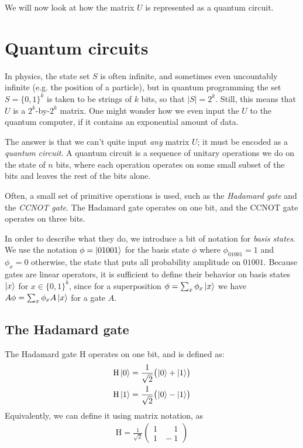 We will now look at how the matrix $U$ is represented as a quantum circuit.

\section{Quantum circuits}

In physics, the state set $S$ is often infinite, and sometimes even uncountably infinite (e.g. the position of a particle),
but in quantum programming the set $S = \{0,1\}^k$ is taken to be strings of $k$ bits, so that $|S| = 2^k$.
Still, this means that $U$ is a $2^k$-by-$2^k$ matrix. One might wonder how we even input the $U$ to the quantum computer, if it contains an exponential amount of data.

The answer is that we can't quite input \emph{any} matrix $U$; it must be encoded as a \emph{quantum circuit}.
A quantum circuit is a sequence of unitary operations we do on the state of $n$ bits, where each operation operates on some small subset of the bits and leaves the rest of the bits alone.

Often, a small set of primitive operations is used, such as the \emph{Hadamard gate} and the \emph{CCNOT gate}.
The Hadamard gate operates on one bit, and the CCNOT gate operates on three bits.

In order to describe what they do, we introduce a bit of notation for \emph{basis states}.
We use the notation $\phi = \ket{01001}$ for the basis state $\phi$ where $\phi_{01001} = 1$ and $\phi_x = 0$ otherwise, \ie the state that puts all probability amplitude on $01001$.
Because gates are linear operators, it is sufficient to define their behavior on basis states $\ket{x}$ for $x \in \{0,1\}^k$,
since for a superposition $\phi = \sum_x \phi_x \ket{x}$ we have $A\phi = \sum_x \phi_x A \ket{x}$ for a gate $A$.

\subsection{The Hadamard gate}

\newcommand{\Ha}{\mathrm{H}}
\newcommand{\CCNOT}{\mathrm{CCNOT}}
\newcommand{\kets}[1]{\big(\kern-0.1em #1\!\big)}

The Hadamard gate $\Ha$ operates on one bit, and is defined as:
\begin{align*}
  \Ha\ket{0} = \frac{1}{\sqrt{2}}\kets{\ket{0} + \ket{1}} \\
  \Ha\ket{1} = \frac{1}{\sqrt{2}}\kets{\ket{0} - \ket{1}}
\end{align*}
Equivalently, we can define it using matrix notation, as
\begin{align*}
  \Ha = \frac{1}{\sqrt{2}}\begin{pmatrix}
    1 & \!\!\!\phantom{-}1 \\
    1 & \!\!\!-1
  \end{pmatrix}
\end{align*}


